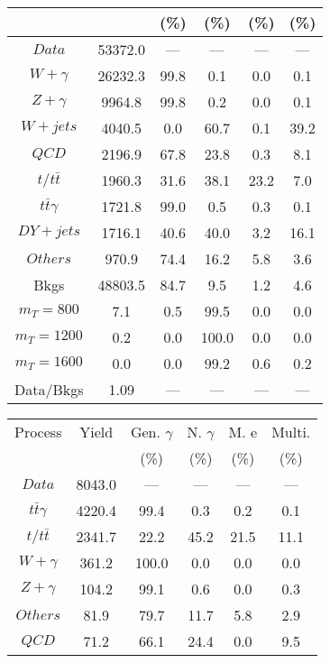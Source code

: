 \begin{figure}
\begin{minipage}[c]{0.32\textwidth}
{\begin{tabular}{cccccc}
 &  & (\%) & (\%) & (\%) & (\%)  \\
\hline
                                                                      $ Data $ &  53372.0 &  --- &  --- &  --- &  ---\\
$ W+\gamma $ &  26232.3 &  99.8 &  0.1 &  0.0 &  0.1\\
$ Z+\gamma $ &  9964.8 &  99.8 &  0.2 &  0.0 &  0.1\\
$ W+jets $ &  4040.5 &  0.0 &  60.7 &  0.1 &  39.2\\
$ QCD $ &  2196.9 &  67.8 &  23.8 &  0.3 &  8.1\\
$ t/t\bar{t} $ &  1960.3 &  31.6 &  38.1 &  23.2 &  7.0\\
$ t\bar{t}\gamma $ &  1721.8 &  99.0 &  0.5 &  0.3 &  0.1\\
$ DY+jets $ &  1716.1 &  40.6 &  40.0 &  3.2 &  16.1\\
$ Others $ &  970.9 &  74.4 &  16.2 &  5.8 &  3.6\\
Bkgs &  48803.5 &  84.7 &  9.5 &  1.2 &  4.6\\
$ m_{T} = 800 $ &  7.1 &  0.5 &  99.5 &  0.0 &  0.0\\
$ m_{T} = 1200 $ &  0.2 &  0.0 &  100.0 &  0.0 &  0.0\\
$ m_{T} = 1600 $ &  0.0 &  0.0 &  99.2 &  0.6 &  0.2\\
Data/Bkgs &  1.09 &  --- &  --- &  --- &  ---\\
\hline
\end{tabular}
}
\end{minipage}
\begin{minipage}[c]{0.32\textwidth}
\centering
\tiny{
\begin{tabular}{cccccc}
\hline
Process & Yield & Gen. $\gamma$ & N. $\gamma$ & M. e & Multi. \\
 &  & (\%) & (\%) & (\%) & (\%)  \\
\hline
                                                                      $ Data $ &  8043.0 &  --- &  --- &  --- &  ---\\
$ t\bar{t}\gamma $ &  4220.4 &  99.4 &  0.3 &  0.2 &  0.1\\
$ t/t\bar{t} $ &  2341.7 &  22.2 &  45.2 &  21.5 &  11.1\\
$ W+\gamma $ &  361.2 &  100.0 &  0.0 &  0.0 &  0.0\\
$ Z+\gamma $ &  104.2 &  99.1 &  0.6 &  0.0 &  0.3\\
$ Others $ &  81.9 &  79.7 &  11.7 &  5.8 &  2.9\\
$ QCD $ &  71.2 &  66.1 &  24.4 &  0.0 &  9.5\\

\end{tabular}}
\end{minipage}
\end{figure}
